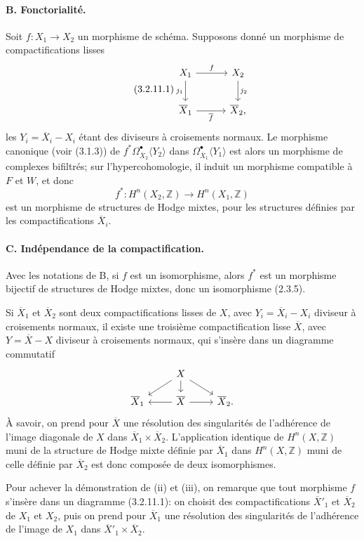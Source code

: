 \documentclass[10pt]{article}
\newcommand{\Z}{\mathbb Z}
\begin{document}
\paragraph{B. Fonctorialité.} Soit $f:X_1\to X_2$ un morphisme de schéma. Supposons donné un morphisme de compactifications lisses
\[
\tag{3.2.11.1}
\begin{tikzcd}[column sep=3em,row sep=2.1em]
X_1 \arrow[r,"f"] \arrow[d,"j_1"'] & X_2 \arrow[d,"j_2"]\\
\overline X_1 \arrow[r,"\overline f"'] & \overline X_2 ,
\end{tikzcd}
\]
les $Y_i=\overline X_i-X_i$ étant des diviseurs à croisements normaux. Le morphisme canonique (voir (3.1.3)) de $f^*\Omega_{\overline X_2}^{\bullet}\langle Y_2\rangle$ dans $\Omega_{\overline X_1}^{\bullet}\langle Y_1\rangle$ est alors un morphisme de complexes bifiltrés; sur l'hypercohomologie, il induit un morphisme compatible à $F$ et $W$, et donc
\[
f^*:H^n(X_2,\Z)\longrightarrow H^n(X_1,\Z)
\]
est un morphisme de structures de Hodge mixtes, pour les structures définies par les compactifications $\overline X_i$.

\paragraph{C. Indépendance de la compactification.} Avec les notations de B, si $f$ est un isomorphisme, alors $f^*$ est un morphisme bijectif de structures de Hodge mixtes, donc un isomorphisme (2.3.5).

Si $\overline X_1$ et $\overline X_2$ sont deux compactifications lisses de $X$, avec $Y_i=\overline X_i-X_i$ diviseur à croisements normaux, il existe une troisième compactification lisse $\overline X$, avec $Y=\overline X-X$ diviseur à croisements normaux, qui s'insère dans un diagramme commutatif
\[
\begin{tikzcd}[row sep=1.2em,column sep=2.4em]
& X \arrow[dl] \arrow[d] \arrow[dr] & \\
\overline X_1 & \overline X \arrow[l] \arrow[r] & \overline X_2 .
\end{tikzcd}
\]
À savoir, on prend pour $\overline X$ une résolution des singularités de l'adhérence de l'image diagonale de $X$ dans $\overline X_1\times\overline X_2$. L'application identique de $H^n(X,\Z)$ muni de la structure de Hodge mixte définie par $\overline X_1$ dans $H^n(X,\Z)$ muni de celle définie par $\overline X_2$ est donc composée de deux isomorphismes.

Pour achever la démonstration de (ii) et (iii), on remarque que tout morphisme $f$ s'insère dans un diagramme (3.2.11.1): on choisit des compactifications $\overline X'_1$ et $\overline X_2$ de $X_1$ et $X_2$, puis on prend pour $\overline X_1$ une résolution des singularités de l'adhérence de l'image de $X_1$ dans $\overline X'_1\times\overline X_2$.
\end{document}
